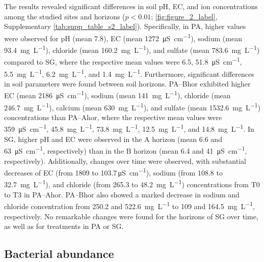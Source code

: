 The results revealed significant differences in soil pH, EC, and ion concentrations among the studied sites and horizons (\(p < 0.01\); \cref{fig:figure_2_label}, Supplementary \cref{tab:supp_table_s2_label}). Specifically, in PA, higher values were observed for pH (mean 7.8), EC (mean \SI{1272}{\micro\siemens\per\centi\metre}), sodium (mean \SI{93.4}{\milli\gram\per\liter}), chloride (mean \SI{160.2}{\milli\gram\per\liter}), and sulfate (mean \SI{783.6}{\milli\gram\per\liter}) compared to SG, where the respective mean values were 6.5, \SI{51.8}{\micro\siemens\per\centi\metre}, \SI{5.5}{\milli\gram\per\liter}, \SI{6.2}{\milli\gram\per\liter}, and \SI{1.4}{\milli\gram\per\liter}. Furthermore, significant differences in soil parameters were found between soil horizons. PA--Bhor exhibited higher EC (mean \SI{2186}{\micro\siemens\per\centi\metre}), sodium (mean \SI{141}{\milli\gram\per\liter}), chloride (mean \SI{246.7}{\milli\gram\per\liter}), calcium (mean \SI{630}{\milli\gram\per\liter}), and sulfate (mean \SI{1532.6}{\milli\gram\per\liter}) concentrations than PA--Ahor, where the respective mean values were \SI{359}{\micro\siemens\per\centi\metre}, \SI{45.8}{\milli\gram\per\liter}, \SI{73.8}{\milli\gram\per\liter}, \SI{12.5}{\milli\gram\per\liter}, and \SI{14.8}{\milli\gram\per\liter}. In SG, higher pH and EC were observed in the A horizon (mean 6.6 and \SI{63}{\micro\siemens\per\centi\metre}, respectively) than in the B horizon (mean 6.4 and \SI{41}{\micro\siemens\per\centi\metre}, respectively). Additionally, changes over time were observed, with substantial decreases of EC (from \num{1809} to \num{103.7}\,\si{\micro\siemens\per\centi\metre}), sodium (from \num{108.8} to \SI{32.7}{\milli\gram\per\liter}), and chloride (from \num{265.3} to \SI{48.2}{\milli\gram\per\liter}) concentrations from T0 to T3 in PA--Ahor. PA--Bhor also showed a marked decrease in sodium and chloride concentration from \num{250.2} and \SI{522.6}{\milli\gram\per\liter} to \num{109} and \SI{164.5}{\milli\gram\per\liter}, respectively. 
No remarkable changes were found for the horizons of SG over time, as well as for treatments in PA or SG.

\subsection{Bacterial abundance}

